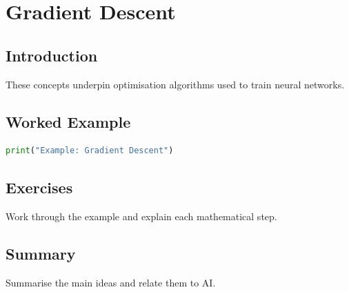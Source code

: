 \chapter{Gradient Descent}
\label{chap:vol4-20}



\section{Introduction}
These concepts underpin optimisation algorithms used to train neural networks.

\section{Worked Example}
\begin{lstlisting}[language=Python]
print("Example: Gradient Descent")
\end{lstlisting}

\section{Exercises}
\begin{exercise}
Work through the example and explain each mathematical step.
\end{exercise}

\section{Summary}
Summarise the main ideas and relate them to AI.
